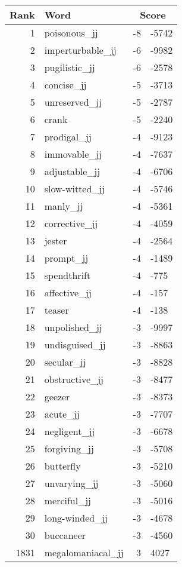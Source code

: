 \begin{longtable}[!htbp]{| rlr@{.}l |}
    \hline
    \textbf{Rank} & \textbf{Word} & \multicolumn{2}{c|}{\textbf{Score}} \\
    \hline
    \endhead
    1 & poisonous\_jj & -8 & -5742 \\
    2 & imperturbable\_jj & -6 & -9982 \\
    3 & pugilistic\_jj & -6 & -2578 \\
    4 & concise\_jj & -5 & -3713 \\
    5 & unreserved\_jj & -5 & -2787 \\
    6 & crank & -5 & -2240 \\
    7 & prodigal\_jj & -4 & -9123 \\
    8 & immovable\_jj & -4 & -7637 \\
    9 & adjustable\_jj & -4 & -6706 \\
    10 & slow-witted\_jj & -4 & -5746 \\
    11 & manly\_jj & -4 & -5361 \\
    12 & corrective\_jj & -4 & -4059 \\
    13 & jester & -4 & -2564 \\
    14 & prompt\_jj & -4 & -1489 \\
    15 & spendthrift & -4 & -775 \\
    16 & affective\_jj & -4 & -157 \\
    17 & teaser & -4 & -138 \\
    18 & unpolished\_jj & -3 & -9997 \\
    19 & undisguised\_jj & -3 & -8863 \\
    20 & secular\_jj & -3 & -8828 \\
    21 & obstructive\_jj & -3 & -8477 \\
    22 & geezer & -3 & -8373 \\
    23 & acute\_jj & -3 & -7707 \\
    24 & negligent\_jj & -3 & -6678 \\
    25 & forgiving\_jj & -3 & -5708 \\
    26 & butterfly & -3 & -5210 \\
    27 & unvarying\_jj & -3 & -5060 \\
    28 & merciful\_jj & -3 & -5016 \\
    29 & long-winded\_jj & -3 & -4678 \\
    30 & buccaneer & -3 & -4560 \\
    1831 & megalomaniacal\_jj & 3 & 4027 \\

\end{longtable}
